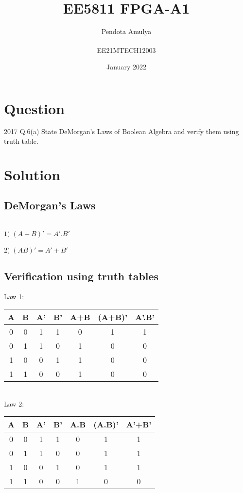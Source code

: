 \documentclass{article}
\title{EE5811 FPGA-A1}
\author{Pendota Amulya \\ \\EE21MTECH12003 }
\date{January 2022}
\begin{document}
\maketitle
\section{Question}
2017 Q.6(a) State DeMorgan's Laws of Boolean Algebra and verify them using truth table.
\section{Solution}
\subsection{DeMorgan's Laws}
\\$1)\; (A+B)'=A'.B'$\\
\\$2)\;(AB)'=A'+B'$
\subsection{Verification using truth tables}
Law 1: 
    \begin{table} [h]
    \centering
    \begin{tabular}{ | c | c | c | c | c | c | c | }
    \hline
    A & B & A' & B'& A+B & (A+B)' & A'.B' \\ [0.5ex]
     \hline
    0 & 0 & 1 & 1 & 0 & 1 & 1\\
    0 & 1 & 1 & 0 & 1 & 0 & 0\\
    1 & 0 & 0 & 1 & 1 & 0 & 0\\
    1 & 1 & 0 & 0 & 1 & 0 & 0\\ [1ex]
    \hline
    \end{tabular}
    \end{table}
\\
Law 2:
    \begin{table} [h]
    \centering
    \begin{tabular}{ | c | c | c | c | c | c | c | }
    \hline
    A & B & A' & B'& A.B & (A.B)' & A'+B' \\ [0.5ex]
     \hline
    0 & 0 & 1 & 1 & 0 & 1 & 1\\
    0 & 1 & 1 & 0 & 0 & 1 & 1\\
    1 & 0 & 0 & 1 & 0 & 1 & 1\\
    1 & 1 & 0 & 0 & 1 & 0 & 0\\ [1ex]
    \hline
    \end{tabular}
    \end{table}
\end{document}
